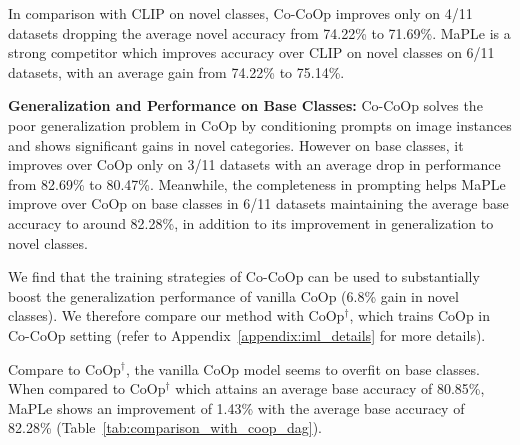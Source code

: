 \documentclass[10pt,twocolumn,letterpaper]{article}
\begin{document}
In comparison with CLIP on novel classes, Co-CoOp improves only on 4/11 datasets dropping the average novel accuracy from 74.22\% to 71.69\%. MaPLe is a strong competitor which improves accuracy over CLIP on novel classes on 6/11 datasets, with an average gain from 74.22\% to 75.14\%.

\noindent \textbf{Generalization and Performance on Base Classes:} 
Co-CoOp solves the poor generalization problem in CoOp by conditioning prompts on image instances and shows significant gains in novel categories. However on base classes, it improves over CoOp only on 3/11 datasets with an average drop in performance from 82.69\% to 80.47\%. Meanwhile, the completeness in prompting helps MaPLe improve over CoOp on base classes in 6/11 datasets maintaining the average base accuracy to around 82.28\%, in addition to its improvement in generalization to novel classes.

We find that the training strategies of Co-CoOp can be used to substantially boost the generalization performance of vanilla CoOp (6.8\% gain in novel classes). We therefore compare our method with CoOp$^{\dag}$, which trains CoOp in Co-CoOp setting (refer to Appendix~\ref{appendix:iml_details} for more details).

\begin{table}[!h]
\vspace{-0.1in}
    \centering
    \caption{ Generalization comparison of MaPLe with CoOp\dag.}
    \label{tab:comparison_with_coop_dag}
    \vspace{-0.15in}
\end{table}

Compare to CoOp$^{\dag}$, the vanilla CoOp model seems to overfit on base classes. When compared to CoOp$^{\dag}$ which attains an average base accuracy of 80.85\%, MaPLe shows an improvement of 1.43\% with the average base accuracy of 82.28\% (Table~\ref{tab:comparison_with_coop_dag}).
 
\end{document}
